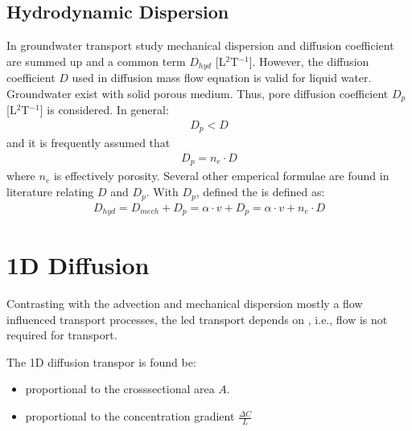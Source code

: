 \documentclass[letterpaper,10pt,english]{jupyterBook}
\begin{document}
\subsection{Hydrodynamic Dispersion}
\label{\detokenize{content/transport/L9/21_conservative_transport:hydrodynamic-dispersion}}
\sphinxAtStartPar
In groundwater transport study mechanical dispersion and diffusion coefficient are summed up and a common term  \(D_{hyd}\) {[}L\(^2\)T\(^{-1}\){]}. However, the diffusion coefficient \(D\) used in diffusion mass flow equation is valid for liquid water. Groundwater exist with solid porous medium. Thus, pore diffusion coefficient \(D_p\) {[}L\(^2\)T\(^{-1}\){]} is considered. In general:
\begin{equation*}
\begin{split}
D_p < D
\end{split}
\end{equation*}
\sphinxAtStartPar
and it is frequently assumed that
\begin{equation*}
\begin{split}
D_p = n_e \cdot D
\end{split}
\end{equation*}
\sphinxAtStartPar
where \(n_e\) is effectively porosity. Several other emperical formulae are found in literature relating \(D\) and \(D_p\). With \(D_p\), defined the  is defined as:
\begin{equation*}
\begin{split}
D_{hyd} = D_{mech} + D_p = \alpha \cdot v + D_p = \alpha \cdot v + n_e \cdot D
\end{split}
\end{equation*}

\section{1D Diffusion}
\label{\detokenize{content/transport/L9/21_conservative_transport:d-diffusion}}
\sphinxAtStartPar
Contrasting with the advection and mechanical dispersion \sphinxhyphen{} mostly a flow influenced transport processes, the  led transport depends on , i.e., flow is not required for transport.

\sphinxAtStartPar
The 1D diffusion transpor is found be:
\begin{itemize}
\item {} 
\sphinxAtStartPar
proportional to the cross\sphinxhyphen{}sectional area \(A\).

\item {} 
\sphinxAtStartPar
proportional to the concentration gradient \(\frac{\Delta C}{L}\)

\end{itemize}
\end{document}
